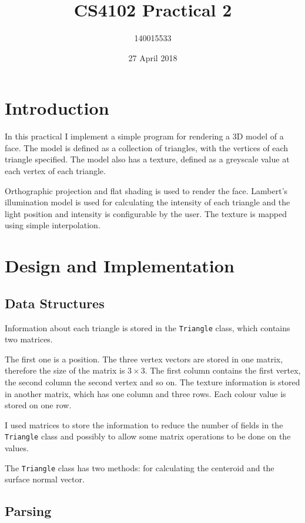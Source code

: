 \documentclass[]{article}
\title{CS4102 Practical 2}
\author{140015533}
\date{27 April 2018}
\begin{document}
\maketitle

\section{Introduction}

In this practical I implement a simple program for rendering a 3D model of a face. The model is defined as a collection of triangles, with the vertices of each triangle specified. The model also has a texture, defined as a greyscale value at each vertex of each triangle.

Orthographic projection and flat shading is used to render the face. Lambert's illumination model is used for calculating the intensity of each triangle and the light position and intensity is configurable by the user. The texture is mapped using simple interpolation.

\section{Design and Implementation}

\subsection{Data Structures}

Information about each triangle is stored in the \texttt{Triangle} class, which contains two matrices.

The first one is a position. The three vertex vectors are stored in one matrix, therefore the size of the matrix is $3 \times 3$. The first column contains the first vertex, the second column the second vertex and so on. The texture information is stored in another matrix, which has one column and three rows. Each colour value is stored on one row.

I used matrices to store the information to reduce the number of fields in the \texttt{Triangle} class and possibly to allow some matrix operations to be done on the values.

The \texttt{Triangle} class has two methods: for calculating the centeroid and the surface normal vector.

\subsection{Parsing}
\end{document}
